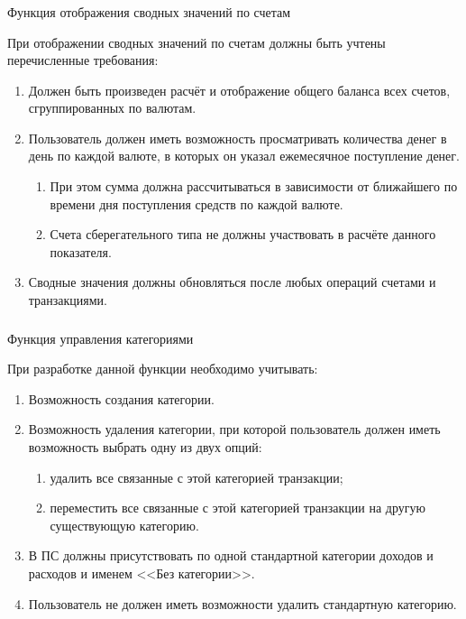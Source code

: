 \subsubsection{} Функция отображения сводных значений по счетам
\label{sec:domain:specification:wallets_stats}

При отображении сводных значений по счетам должны быть учтены перечисленные требования:

\begin{enumerate}
    \item Должен быть произведен расчёт и отображение общего баланса всех счетов, сгруппированных по валютам.
    \item Пользователь должен иметь возможность просматривать количества денег в день по каждой валюте, в которых он указал ежемесячное поступление денег.
    \begin{enumerate}
        \item При этом сумма должна рассчитываться в зависимости от ближайшего по времени дня поступления средств по каждой валюте.
        \item Счета сберегательного типа не должны участвовать в расчёте данного показателя.
    \end{enumerate}
    \item Сводные значения должны обновляться после любых операций счетами и транзакциями.
\end{enumerate}

\subsubsection{} Функция управления категориями
\label{sec:domain:specification:categories}

При разработке данной функции необходимо учитывать:

\begin{enumerate}
    \item Возможность создания категории.
    \item Возможность удаления категории, при которой пользователь должен иметь возможность выбрать одну из двух опций:
    \begin{enumerate}
        \item удалить все связанные с этой категорией транзакции;
        \item переместить все связанные с этой категорией транзакции на другую существующую категорию.
    \end{enumerate}
    \item В ПС должны присутствовать по одной стандартной категории доходов и расходов и именем <<Без категории>>.
    \item Пользователь не должен иметь возможности удалить стандартную категорию.
\end{enumerate}

